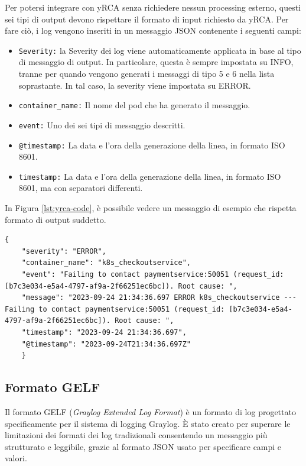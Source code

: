 Per potersi integrare con yRCA senza richiedere nessun processing esterno, questi sei tipi di output devono rispettare il formato di input richiesto da yRCA. Per fare ciò, i log vengono inseriti in un messaggio JSON contenente i seguenti campi:
\begin{itemize}
    \item \texttt{Severity:} la Severity dei log viene automaticamente applicata in base al tipo di messaggio di output. In particolare, questa è sempre impostata su INFO, tranne per quando vengono generati i messaggi di tipo 5 e 6 nella lista soprastante. In tal caso, la severity viene impostata su ERROR.
    \item \texttt{container\_name:} Il nome del pod che ha generato il messaggio.
    \item \texttt{event:} Uno dei sei tipi di messaggio descritti.
    \item \texttt{@timestamp:} La data e l'ora della generazione della linea, in formato ISO 8601.
    \item \texttt{timestamp:} La data e l'ora della generazione della linea, in formato ISO 8601, ma con separatori differenti.
    
\end{itemize}

In Figura \ref{lst:yrca-code}, è possibile vedere un messaggio di esempio che rispetta formato di output suddetto.

\begin{lstlisting}[caption={Formato di output per yRCA.},label=lst:yrca-code, escapechar=|, keywordstyle=\color{black}, commentstyle=\color{black},stringstyle=\color{black},numberstyle=\color{black}]
    {
    "severity": "ERROR", 
    "container_name": "k8s_checkoutservice", 
    "event": "Failing to contact paymentservice:50051 (request_id: [b7c3e034-e5a4-4797-af9a-2f66251ec6bc]). Root cause: ",
    "message": "2023-09-24 21:34:36.697 ERROR k8s_checkoutservice --- Failing to contact paymentservice:50051 (request_id: [b7c3e034-e5a4-4797-af9a-2f66251ec6bc]). Root cause: ",
    "timestamp": "2023-09-24 21:34:36.697",
    "@timestamp": "2023-09-24T21:34:36.697Z"
    }

\end{lstlisting}

\subsection{Formato GELF}

Il formato GELF (\textit{Graylog Extended Log Format}) \cite{gelf_format} è un formato di log progettato specificamente per il sistema di logging Graylog. È stato creato per superare le limitazioni dei formati dei log tradizionali consentendo un messaggio più strutturato e leggibile, grazie al formato JSON usato per specificare campi e valori.

